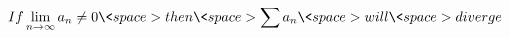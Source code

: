 \documentclass[preview]{standalone}
\begin{document}
\begin{align*}
If \lim_{n\to\infty} a_{n} \neq 0 \<space> then \<space> \sum a_{n} \<space>will \<space>diverge
\end{align*}
\end{document}
